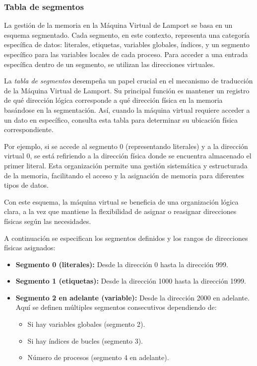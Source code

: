 \subsubsection{Tabla de segmentos}\label{subsubsec:pageTableLVM}
La gestión de la memoria en la Máquina Virtual de Lamport se basa en un esquema segmentado. Cada segmento, en este contexto, representa una categoría específica de datos: literales, etiquetas, variables globales, índices, y un segmento específico para las variables locales de cada proceso. Para acceder a una entrada específica dentro de un segmento, se utilizan las direcciones virtuales. 


La \textit{tabla de segmentos} desempeña un papel crucial en el mecanismo de traducción de la Máquina Virtual de Lamport. Su principal función es mantener un registro de qué dirección lógica corresponde a qué dirección física en la memoria basándose en la segmentación. Así, cuando la máquina virtual requiere acceder a un dato en específico, consulta esta tabla para determinar su ubicación física correspondiente.


Por ejemplo, si se accede al segmento 0 (representando literales) y a la dirección virtual 0, se está refiriendo a la dirección física donde se encuentra almacenado el primer literal. Esta organización permite una gestión sistemática y estructurada de la memoria, facilitando el acceso y la asignación de memoria para diferentes tipos de datos.


Con este esquema, la máquina virtual se beneficia de una organización lógica clara, a la vez que mantiene la flexibilidad de asignar o reasignar direcciones físicas según las necesidades.


A continuación se especifican los segmentos definidos y los rangos de direcciones físicas asignados:

\begin{itemize}
    \item \textbf{Segmento 0 (literales):} Desde la dirección 0 hasta la dirección 999.
    \item \textbf{Segmento 1 (etiquetas):} Desde la dirección 1000 hasta la dirección 1999.
    \item \textbf{Segmento 2 en adelante (variable):} Desde la dirección 2000 en adelante. Aquí se definen múltiples segmentos consecutivos dependiendo de:
    \begin{itemize}
        \item Si hay variables globales (segmento 2).
        \item Si hay índices de bucles (segmento 3).
        \item Número de procesos (segmento 4 en adelante).
    \end{itemize}
\end{itemize}

